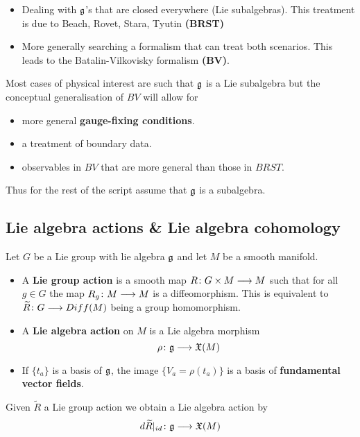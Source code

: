 \begin{itemize}
  \item Dealing with $\mathfrak{g}$'s that are closed everywhere (Lie subalgebras). This treatment is due to Beach, Rovet, Stara, Tyutin \textbf{(BRST)}
  \item More generally searching a formalism that can treat both scenarios. This leads to the Batalin-Vilkovisky formalism \textbf{(BV)}.
\end{itemize}

Most cases of physical interest are such that $\mathfrak{g}$ is a Lie subalgebra but the conceptual generalisation of $BV$ will allow for
\begin{itemize}
  \item more general \textbf{gauge-fixing conditions}.
  \item a treatment of boundary data.
  \item observables in $BV$ that are more general than those in $BRST$.
\end{itemize}

Thus for the rest of the script assume that $\mathfrak{g}$ is a subalgebra.


\subsection{Lie algebra actions \& Lie algebra cohomology}

\begin{definition}
  Let $G$ be a Lie group with lie algebra $\mathfrak{g}$ and let $M$ be a smooth manifold.
  \begin{itemize}
    \item A  \textbf{Lie group action} is a smooth map $R\colon G \times M \longrightarrow M$ such that for all $g \in G$ the map $R_g \colon M \longrightarrow M$ is a diffeomorphism. This is equivalent to $\widetilde{R} \colon G \longrightarrow Diff(M)$ being a group homomorphism.

    \item A \textbf{Lie algebra action} on $M$ is a Lie algebra morphism
    $$ \rho \colon \mathfrak{g} \longrightarrow \mathfrak{X}(M) $$

    \item If $\{t_a\}$ is a basis of $\mathfrak{g}$, the image $\{V_a = \rho(t_a)\}$ is a basis of \textbf{fundamental vector fields}.
  \end{itemize}
\end{definition}

\begin{example}
  Given $\widetilde{R}$ a Lie group action we obtain a Lie algebra action by
  $$ d \widetilde{R} |_{id} \colon \mathfrak{g} \longrightarrow \mathfrak{X}(M) $$
\end{example}


